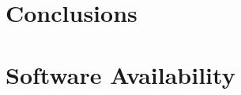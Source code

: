 \documentclass[10pt,journal,compsoc]{IEEEtran}
\begin{document}
\section{Conclusions}

\section{Software Availability}





%
%



%
%
\end{document}
